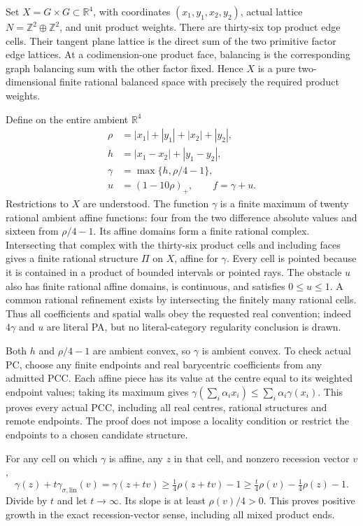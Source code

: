 \documentclass[
  10pt,
]{article}
\begin{document}
Set \(X=G\times G\subset\mathbb{R}^4\), with coordinates
\((x_1,y_1,x_2,y_2)\), actual lattice
\(N=\mathbb{Z}^2\oplus\mathbb{Z}^2\), and unit product weights. There are
thirty-six top product edge cells. Their tangent plane lattice is the
direct sum of the two primitive factor edge lattices. At a
codimension-one product face, balancing is the corresponding graph
balancing sum with the other factor fixed. Hence \(X\) is a pure
two-dimensional finite rational balanced space with precisely the
required product weights.

Define on the entire ambient \(\mathbb{R}^4\) \[
\begin{split}
 \rho&=|x_1|+|y_1|+|x_2|+|y_2|,\\
 h&=|x_1-x_2|+|y_1-y_2|,\\
 \gamma&=\max\{h,\rho/4-1\},\\
 u&=(1-10\rho)_+,\qquad f=\gamma+u.
\end{split} \tag{5}
\] Restrictions to \(X\) are understood. The function \(\gamma\) is a
finite maximum of twenty rational ambient affine functions: four from
the two difference absolute values and sixteen from \(\rho/4-1\). Its
affine domains form a finite rational complex. Intersecting that complex
with the thirty-six product cells and including faces gives a finite
rational structure \(\Pi\) on \(X\), affine for \(\gamma\). Every cell
is pointed because it is contained in a product of bounded intervals or
pointed rays. The obstacle \(u\) also has finite rational affine
domains, is continuous, and satisfies \(0\leq u\leq1\). A common
rational refinement exists by intersecting the finitely many rational
cells. Thus all coefficients and spatial walls obey the requested real
convention; indeed \(4\gamma\) and \(u\) are literal PA, but no
literal-category regularity conclusion is drawn.

Both \(h\) and \(\rho/4-1\) are ambient convex, so \(\gamma\) is ambient
convex. To check actual PC, choose any finite endpoints and real
barycentric coefficients from any admitted PCC. Each affine piece has
its value at the centre equal to its weighted endpoint values; taking
its maximum gives
\(\gamma(\sum_i\alpha_ix_i)\leq\sum_i\alpha_i\gamma(x_i)\). This proves
every actual PCC, including all real centres, rational structures and
remote endpoints. The proof does not impose a locality condition or
restrict the endpoints to a chosen candidate structure.

For any cell on which \(\gamma\) is affine, any \(z\) in that cell, and
nonzero recession vector \(v\), \[
 \gamma(z)+t\gamma_{\sigma,\mathrm{lin}}(v)
 =\gamma(z+tv)\geq\tfrac14\rho(z+tv)-1
 \geq\tfrac t4\rho(v)-\tfrac14\rho(z)-1.
\] Divide by \(t\) and let \(t\to\infty\). Its slope is at least
\(\rho(v)/4>0\). This proves positive growth in the exact
recession-vector sense, including all mixed product ends.
\end{document}
